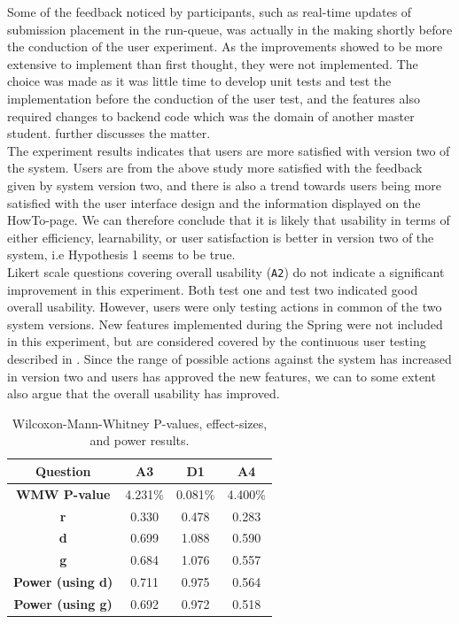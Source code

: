Some of the feedback noticed by participants, such as real-time updates of submission placement in the run-queue, was actually in the making shortly before the conduction of the user experiment. As the improvements showed to be more extensive to implement than first thought, they were not implemented. The choice was made as it was little time to develop unit tests and test the implementation before the conduction of the user test, and the features also required changes to backend code which was the domain of another master student.  further discusses the matter. \\

The experiment results indicates that users are more satisfied with version two of the system. Users are from the above study more satisfied with the feedback given by system version two, and there is also a trend towards users being more satisfied with the user interface design and the information displayed on the HowTo-page. We can therefore conclude that it is likely that usability in terms of either efficiency, learnability, or user satisfaction is better in version two of the system, i.e Hypothesis 1 seems to be true. \\

Likert scale questions covering overall usability (\texttt{A2}) do not indicate a significant improvement in this experiment. Both test one and test two indicated good overall usability. However, users were only testing actions in common of the two system versions. New features implemented during the Spring were not included in this experiment, but are considered covered by the continuous user testing described in . Since the range of possible actions against the system has increased in version two and users has approved the new features, we can to some extent also argue that the overall usability has improved.

\begin{table}[t!]
    \centering
    \begin{tabular}{|c||c||c||c||}
      \hline
      \textbf{Question} & \textbf{A3} & \textbf{D1} & \textbf{A4} \\\hline
      \textbf{WMW P-value} & 4.231\% & 0.081\% & 4.400\%  \\ \hline
      \textbf{r} & 0.330 & 0.478 & 0.283\\ \hline
      \textbf{d} & 0.699 & 1.088 & 0.590 \\ \hline
      \textbf{g} & 0.684 & 1.076 & 0.557\\ \hline
      \textbf{Power (using d)} & 0.711 & 0.975 & 0.564 \\ \hline
      \textbf{Power (using g)} & 0.692 & 0.972 & 0.518 \\ \hline
    \end{tabular}
    \caption{Wilcoxon-Mann-Whitney P-values, effect-sizes, and power results.}
    \label{tab:significant-results}
\end{table}

